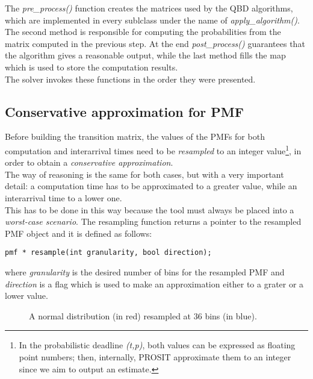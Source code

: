 The \emph{pre\_process()} function creates the matrices used by the QBD algorithms, which are implemented in every sublclass under the name of \emph{apply\_algorithm()}. The second method is responsible for computing the probabilities from the matrix computed in the previous step. At the end \emph{post\_process()} guarantees that the algorithm gives a reasonable output, while the last method fills the map which is used to store the computation results.\\
The solver invokes these functions in the order they were presented.

\subsection{Conservative approximation for PMF}
Before building the transition matrix, the values of the PMFs for both computation and interarrival times need to be \emph{resampled} to an integer value\footnote{In the probabilistic deadline \emph{(t,p)}, both values can be expressed as floating point numbers; then, internally, PROSIT approximate them to an integer since we aim to output an estimate.}, in order to obtain a \emph{conservative approximation}.\\
The way of reasoning is the same for both cases, but with a very important detail: a computation time has to be approximated to a greater value, while an interarrival time to a lower one.\\ 
This has to be done in this way because the tool must always be placed into a \emph{worst-case scenario}. The resampling function returns a pointer to the resampled PMF object and it is defined as follows:
\begin{lstlisting}[frame=bt, numbers=none]
  pmf * resample(int granularity, bool direction);
\end{lstlisting}

where \emph{granularity} is the desired number of bins for the resampled PMF and \emph{direction} is a flag which is used to make an approximation either to a grater or a lower value.\\
\begin{figure}[H]
  \caption{A normal distribution (in red) resampled at 36 bins (in blue).}
  \label{resample}
\end{figure}

